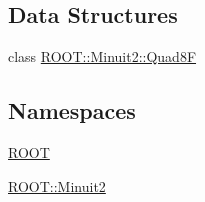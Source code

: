 \subsection*{Data Structures}
\begin{DoxyCompactItemize}
\item 
class \mbox{\hyperlink{classROOT_1_1Minuit2_1_1Quad8F}{R\+O\+O\+T\+::\+Minuit2\+::\+Quad8F}}
\end{DoxyCompactItemize}
\subsection*{Namespaces}
\begin{DoxyCompactItemize}
\item 
 \mbox{\hyperlink{namespaceROOT}{R\+O\+OT}}
\item 
 \mbox{\hyperlink{namespaceROOT_1_1Minuit2}{R\+O\+O\+T\+::\+Minuit2}}
\end{DoxyCompactItemize}
